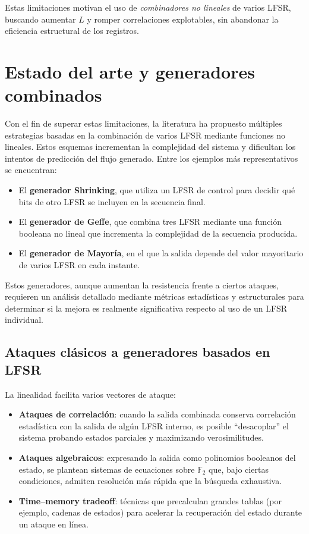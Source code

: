 Estas limitaciones motivan el uso de \emph{combinadores no lineales} de varios
LFSR, buscando aumentar $L$ y romper correlaciones explotables, sin abandonar la
eficiencia estructural de los registros.


\section*{Estado del arte y generadores combinados}

Con el fin de superar estas limitaciones, la literatura ha propuesto múltiples
estrategias basadas en la combinación de varios LFSR mediante funciones no
lineales. Estos esquemas incrementan la complejidad del sistema y dificultan los
intentos de predicción del flujo generado. Entre los ejemplos más representativos
se encuentran:

\begin{itemize}
    \item El \textbf{generador Shrinking}, que utiliza un LFSR de control para
          decidir qué bits de otro LFSR se incluyen en la secuencia final.
    \item El \textbf{generador de Geffe}, que combina tres LFSR mediante una
          función booleana no lineal que incrementa la complejidad de la
          secuencia producida.
    \item El \textbf{generador de Mayoría}, en el que la salida depende del
          valor mayoritario de varios LFSR en cada instante.
\end{itemize}

Estos generadores, aunque aumentan la resistencia frente a ciertos ataques,
requieren un análisis detallado mediante métricas estadísticas y estructurales
para determinar si la mejora es realmente significativa respecto al uso de un
LFSR individual.

\subsection*{Ataques clásicos a generadores basados en LFSR}

La linealidad facilita varios vectores de ataque:
\begin{itemize}
    \item \textbf{Ataques de correlación}: cuando la salida combinada conserva
    correlación estadística con la salida de algún LFSR interno, es posible
    “desacoplar” el sistema probando estados parciales y maximizando verosimilitudes.
    \item \textbf{Ataques algebraicos}: expresando la salida como polinomios
    booleanos del estado, se plantean sistemas de ecuaciones sobre $\mathbb{F}_2$
    que, bajo ciertas condiciones, admiten resolución más rápida que la búsqueda
    exhaustiva.
    \item \textbf{Time–memory tradeoff}: técnicas que precalculan grandes tablas
    (por ejemplo, cadenas de estados) para acelerar la recuperación del estado
    durante un ataque en línea.
\end{itemize}

